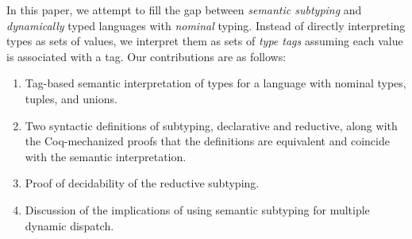 In this paper, we attempt to fill the gap between \emph{semantic subtyping} and 
\emph{dynamically} typed languages with \emph{nominal} typing.
Instead of directly interpreting types as sets of values,
we interpret them as sets of \emph{type tags} assuming 
each value is associated with a tag.
Our contributions are as follows:
\begin{enumerate}
  \item Tag-based semantic interpretation of types for a language
    with nominal types, tuples, and unions.
  \item Two syntactic definitions of subtyping, declarative and reductive,
    along with the Coq-mechanized proofs that the definitions are equivalent
    and coincide with the semantic interpretation. 	
  \item Proof of decidability of the reductive subtyping.
  \item Discussion of the implications of using semantic subtyping
    for multiple dynamic dispatch.
\end{enumerate}







